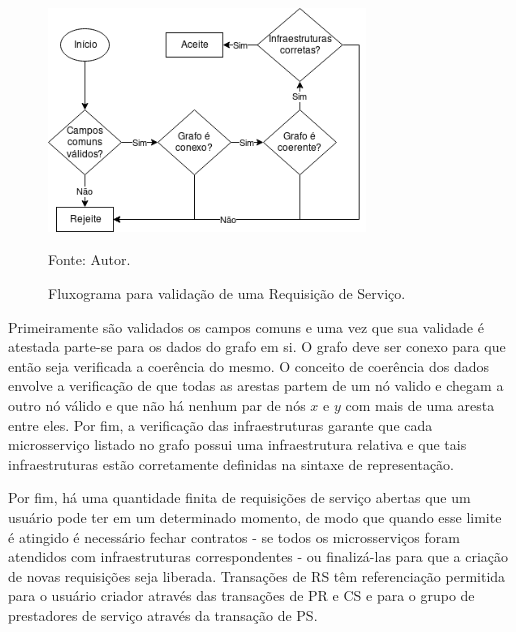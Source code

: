 \begin{figure}[ht!]
\caption{Fluxograma para validação de uma Requisição de Serviço.}
\centering
\includegraphics[width=0.75\textwidth]{imagens/validacao_rs.png}
\begin{center}
        Fonte: Autor.
\end{center}
\label{fig:validacao_rs}
\end{figure}

Primeiramente são validados os campos comuns e uma vez que sua validade é atestada parte-se para os dados do grafo em si. O grafo deve ser conexo para que então seja verificada a coerência do mesmo. O conceito de coerência dos dados envolve a verificação de que todas as arestas partem de um nó valido e chegam a outro nó válido e que não há nenhum par de nós $x$ e $y$ com mais de uma aresta entre eles. Por fim, a verificação das infraestruturas garante que cada microsserviço listado no grafo possui uma infraestrutura relativa e que tais infraestruturas estão corretamente definidas na sintaxe de representação. 

Por fim, há uma quantidade finita de requisições de serviço abertas que um usuário pode ter em um determinado momento, de modo que quando esse limite é atingido é necessário fechar contratos - se todos os microsserviços foram atendidos com infraestruturas correspondentes - ou finalizá-las para que a criação de novas requisições seja liberada. Transações de \ac{RS} têm referenciação permitida para o usuário criador através das transações de \ac{PR} e \ac{CS} e para o grupo de prestadores de serviço através da transação de \ac{PS}.

